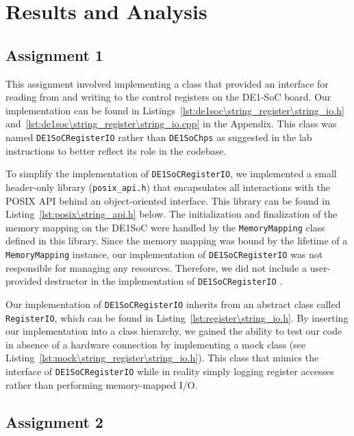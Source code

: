 \documentclass[11pt, letterpaper]{article} %
\begin{document}
\FloatBarrier
\section*{Results and Analysis}

\subsection*{Assignment 1}

This assignment involved implementing a class that provided an interface for reading from and writing to the control registers on the DE1-SoC board. Our implementation can be found in Listings~\ref{lst:de1soc\string_register\string_io.h} and~\ref{lst:de1soc\string_register\string_io.cpp} in the Appendix. This class was named \texttt{DE1SoCRegisterIO} rather than \texttt{DE1SoChps} as suggested in the lab instructions to better reflect its role in the codebase.

To simplify the implementation of \texttt{DE1SoCRegisterIO}, we implemented a small header-only library (\texttt{posix\_api.h}) that encapsulates all interactions with the POSIX API behind an object-oriented interface. This library can be found in Listing~\ref{lst:posix\string_api.h} below. The initialization and finalization of the memory mapping on the DE1SoC were handled by the \texttt{MemoryMapping} class defined in this library. Since the memory mapping was bound by the lifetime of a \texttt{MemoryMapping} instance, our implementation of \texttt{DE1SoCRegisterIO} was not responsible for managing any resources. Therefore, we did not include a user-provided destructor in the implementation of \texttt{DE1SoCRegisterIO} \cite[C.20]{stroustrup-c++-core-guidelines}.

Our implementation of \texttt{DE1SoCRegisterIO} inherits from an abstract class called \texttt{RegisterIO}, which can be found in Listing~\ref{lst:register\string_io.h}. By inserting our implementation into a class hierarchy, we gained the ability to test our code in absence of a hardware connection by implementing a mock class (see Listing~\ref{lst:mock\string_register\string_io.h}). This class that mimics the interface of \texttt{DE1SoCRegisterIO} while in reality simply logging register accesses rather than performing memory-mapped I/O.


\subsection*{Assignment 2}
\end{document}
